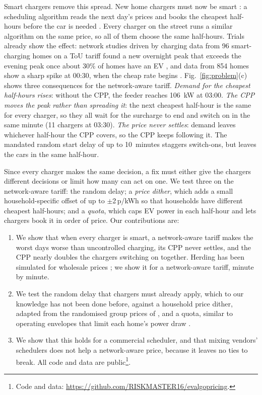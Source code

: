 \documentclass[conference]{IEEEtran}
\newcommand{\pkwh}{\,p/kWh}
\begin{document}
Smart chargers remove this spread. New home chargers must now be smart
\cite{scpregs}: a scheduling algorithm reads the next day's prices and books
the cheapest half-hours before the car is needed \cite{evenergy}. Every
charger on the street runs a similar algorithm on the same price, so all of
them choose the same half-hours. Trials already show the effect: network
studies driven by charging data from 96 smart-charging homes on a ToU tariff
found a new overnight peak that exceeds the evening peak once about 30\% of
homes have an EV \cite{samende2025}, and data from 854 homes show a sharp
spike at 00:30, when the cheap rate begins \cite{catapult2025}. Fig.~\ref{fig:problem}(c) shows three
consequences for the network-aware tariff.
\emph{Demand for the cheapest half-hours rises}: without the CPP, the feeder
reaches 106~kW at 03:00. \emph{The CPP moves the peak rather than spreading
it}: the next cheapest half-hour is the same for every charger, so they all
wait for the surcharge to end and switch on in the same minute (11 chargers
at 03:30). \emph{The price never settles}: demand leaves whichever half-hour
the CPP covers, so the CPP keeps following it. The mandated random start
delay of up to 10~minutes \cite{scpregs} staggers switch-ons, but leaves the
cars in the same half-hour.

Since every charger makes the same decision, a fix must either give the
chargers different decisions or limit how many can act on one. We test three
on the network-aware tariff: the random delay; a \emph{price dither}, which
adds a small household-specific offset of up to $\pm$2\pkwh{} so that
households have different cheapest half-hours; and a \emph{quota}, which caps
EV power in each half-hour and lets chargers book it in order of price. Our
contributions are:
\begin{enumerate}
\item We show that when every charger is smart, a network-aware tariff makes
the worst days worse than uncontrolled charging, its CPP never settles, and
the CPP nearly doubles the chargers switching on together. Herding has been
simulated for wholesale prices \cite{hein2026}; we show it for a
network-aware tariff, minute by minute.
\item We test the random delay that chargers must already apply, which to
our knowledge has not been done before, against a household price dither,
adapted from the randomised group prices of \cite{flath2016}, and a quota,
similar to operating envelopes that limit each home's power draw
\cite{fani2024}.
\item We show that this holds for a commercial scheduler, and that mixing
vendors' schedulers does not help a network-aware price, because it leaves
no ties to break. All code and data are public\footnote{Code and data:
\url{https://github.com/RISKMASTER16/evalgopricing}.}.
\end{enumerate}
\end{document}
